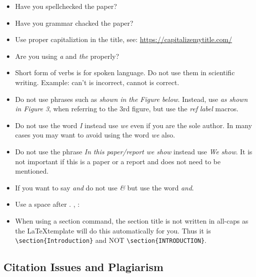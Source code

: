 \begin{itemize}[label=$\Box$]
    \item Have you spellchecked the paper?
    \item Have you grammar chacked the paper?
    \item Use proper capitaliztion in the title, see: \url{https://capitalizemytitle.com/}
     \item Are you using {\em a} and {\em the} properly?
    \item Short form of verbs is for spoken language. Do not use them
      in scientific writing. Example: can't is incorrect, cannot is correct.
    \item Do not use phrases such as {\em shown in the Figure
        below}. Instead, use {\em as shown in Figure 3}, when
      referring to the 3rd figure, but use the {\em ref} {\em label}
      macros.
    \item Do not use the word {\em I} instead use {\em we} even if you
      are the sole author. In many cases you may want to avoid using
      the word {\em we} also.
    \item Do not use the phrase {\em In this paper/report we show}
      instead use {\em We show}. It is not important if this is a
      paper or a report and does not need to be mentioned. 
    \item If you want to say {\em and} do not use {\em \&} but use the
      word {\em and}.
    \item Use a space after . , :
    \item When using a section command, the section title is not
      written in all-caps as the \LaTeX template will do this
      automatically for you. Thus it is \verb|\section{Introduction}|
      and NOT \verb|\section{INTRODUCTION}|.

\end{itemize}

\subsection{Citation Issues and Plagiarism}

